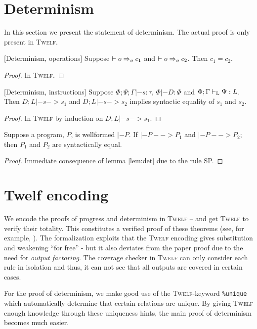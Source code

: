 \documentclass[a4paper, oneside, 10pt, draft]{memoir}
\newcommand{\twelf}{\textsc{Twelf}}
\begin{document}
\section{Determinism}

In this section we present the statement of determinism. The actual
proof is only present in \twelf{}.

\begin{lem}{[Determinism, operations]}
  \label{lem:det-op}
  Suppose $|- o =>_{o} c_1$ and $|- o =>_{o} c_2$. Then $c_1 = c_2$.
\end{lem}
\begin{proof}
  In \twelf{}.
\end{proof}

\begin{lem}{[Determinism, instructions]}
  \label{lem:det}
  Suppose $\Phi;\Psi;\Gamma |- s : \tau$, $\Phi |- D : \Phi$ and
  $\Phi;\Gamma |-_{\mathrm{L}} \Psi : L$. Then $D;L |- s -> s_1$ and $D;L |- s
  -> s_2$ implies syntactic equality of $s_1$ and $s_2$.
\end{lem}
\begin{proof}
  In \twelf{} by induction on $D;L |- s -> s_1$.
\end{proof}
\begin{thm}[Determinism]
  \label{thm:det-pgm}
  Suppose a program, $P$, is wellformed $|- P$. If $|- P --> P_1$
  and $|- P --> P_2$; then $P_1$ and $P_2$ are syntactically equal.
\end{thm}
\begin{proof}
 Immediate consequence of lemma \ref{lem:det} due to the rule SP.
\end{proof}

\section{Twelf encoding}

We encode the proofs of progress and determinism in \twelf{} -- and
get \twelf{} to verify their totality. This constitutes a verified
proof of these theorems (see, for example,
\cite{harper.crary:2005:how}). The formalization exploits that the
\twelf{} encoding gives substitution and weakening ``for free'' - but
it also deviates from the paper proof due to the need for \emph{output
  factoring}. The coverage checker in \twelf{} can only consider each
rule in isolation and thus, it can not see that all outputs are
covered in certain cases.

For the proof of determinism, we make good use of the \twelf{}-keyword
\texttt{\%{}unique} which automatically determine that certain
relations are unique. By giving \twelf{} enough knowledge through
these uniqueness hints, the main proof of determinism becomes much
easier.
\end{document}
